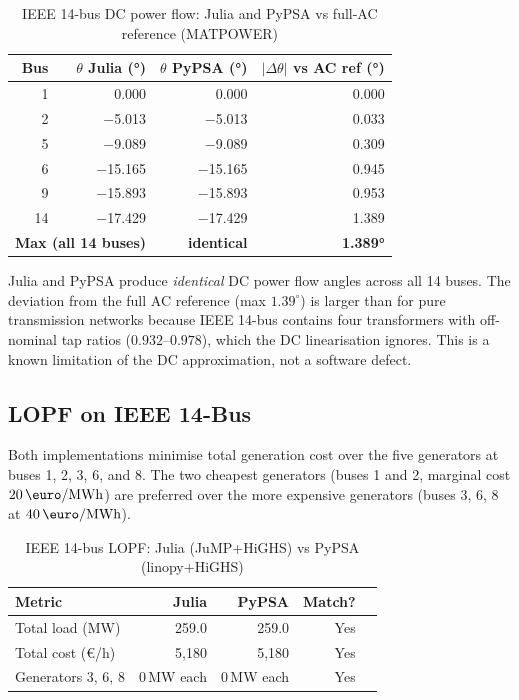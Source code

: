 \begin{table}[H]
\centering
\caption{IEEE 14-bus DC power flow: Julia and PyPSA vs full-AC reference (MATPOWER)}
\label{tab:ieee14_dc}
\begin{tabular}{rrrr}
\toprule
\textbf{Bus} & \textbf{$\theta$ Julia (°)} & \textbf{$\theta$ PyPSA (°)} & \textbf{$|\Delta\theta|$ vs AC ref (°)} \\
\midrule
 1 &   0.000 &   0.000 & 0.000 \\
 2 &  $-$5.013 &  $-$5.013 & 0.033 \\
 5 &  $-$9.089 &  $-$9.089 & 0.309 \\
 6 & $-$15.165 & $-$15.165 & 0.945 \\
 9 & $-$15.893 & $-$15.893 & 0.953 \\
14 & $-$17.429 & $-$17.429 & 1.389 \\
\midrule
\multicolumn{2}{l}{\textbf{Max (all 14 buses)}} & \textbf{identical} & \textbf{1.389°} \\
\bottomrule
\end{tabular}
\end{table}

Julia and PyPSA produce \emph{identical} DC power flow angles across all 14 buses. The deviation from the full AC reference (max $1.39^{\circ}$) is larger than for pure transmission networks because IEEE 14-bus contains four transformers with off-nominal tap ratios ($0.932$--$0.978$), which the DC linearisation ignores. This is a known limitation of the DC approximation, not a software defect.

\subsection{LOPF on IEEE 14-Bus}

Both implementations minimise total generation cost over the five generators at buses 1, 2, 3, 6, and 8. The two cheapest generators (buses 1 and 2, marginal cost $20\,\text{\euro/MWh}$) are preferred over the more expensive generators (buses 3, 6, 8 at $40\,\text{\euro/MWh}$).

\begin{table}[H]
\centering
\caption{IEEE 14-bus LOPF: Julia (JuMP+HiGHS) vs PyPSA (linopy+HiGHS)}
\label{tab:ieee14_lopf}
\begin{tabular}{lrrrr}
\toprule
\textbf{Metric} & \textbf{Julia} & \textbf{PyPSA} & \textbf{Match?} \\
\midrule
Total load (MW)     & 259.0 & 259.0 & Yes \\
Total cost (\euro/h) & 5{,}180 & 5{,}180 & Yes \\
Generators 3, 6, 8  & 0\,MW each & 0\,MW each & Yes \\
\bottomrule
\end{tabular}
\end{table}

